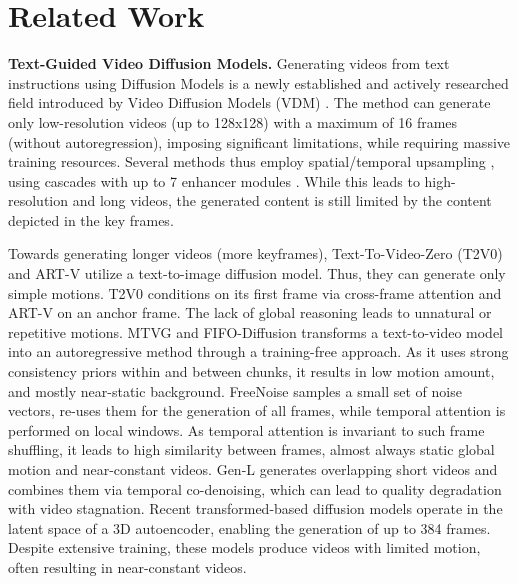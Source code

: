 \section{Related Work}

\noindent\textbf{Text-Guided Video Diffusion Models.}
Generating videos from text instructions using Diffusion Models \cite{DDPM_paper,sohl2015diffusion_theory} is a newly established and actively researched field introduced by Video Diffusion Models (VDM) \cite{video-diffusion-models}. The method can generate only low-resolution videos (up to 128x128) with a maximum of 16 frames (without autoregression), imposing significant limitations, while requiring massive training resources.
Several methods thus employ spatial/temporal upsampling \cite{imagen_video,make-a-video,video-diffusion-models,AlignYourLatents}, using cascades with up to 7 enhancer modules  \cite{imagen_video}. While this leads to high-resolution and long videos, the generated content is still limited by the content depicted in the key frames. 

Towards  generating longer videos (\ie more keyframes), Text-To-Video-Zero (T2V0) \cite{text2video-zero} and ART-V \cite{park2021nerfies_art_v} utilize a text-to-image diffusion model. Thus, they can generate only simple motions. 
T2V0 conditions on its first frame via cross-frame attention and  ART-V on an anchor frame. The lack of global reasoning leads to  unnatural or repetitive motions.  
MTVG \cite{oh2023mtvg} and FIFO-Diffusion \cite{kim2024fifo} transforms a text-to-video model into an autoregressive method through a training-free approach. As it uses strong consistency priors within and between chunks, it results in low motion amount, and mostly near-static background. 
%
%
FreeNoise \cite{qiu2023freenoise} samples a small set of noise vectors, re-uses them for the generation of all frames, while temporal attention is performed on local windows. As temporal attention is invariant to such frame shuffling, it leads to high similarity between frames, almost always static global motion and near-constant videos.  
Gen-L \cite{wang2023gen_L} generates overlapping short videos and combines them via temporal co-denoising, which can lead to quality degradation with video stagnation. Recent transformed-based diffusion models  \cite{opensora,opensoraplan} operate
in the latent space of a 3D autoencoder, enabling the generation of up to 384 frames. Despite extensive training,
these models produce videos with limited motion, often resulting in near-constant videos.

